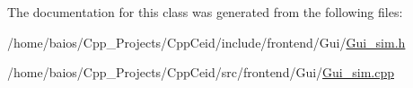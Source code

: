 The documentation for this class was generated from the following files\-:\begin{DoxyCompactItemize}
\item 
/home/baios/\-Cpp\-\_\-\-Projects/\-Cpp\-Ceid/include/frontend/\-Gui/\hyperlink{_gui__sim_8h}{Gui\-\_\-sim.\-h}\item 
/home/baios/\-Cpp\-\_\-\-Projects/\-Cpp\-Ceid/src/frontend/\-Gui/\hyperlink{_gui__sim_8cpp}{Gui\-\_\-sim.\-cpp}\end{DoxyCompactItemize}

